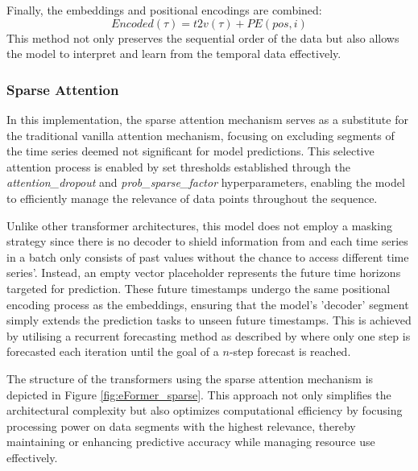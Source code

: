 \documentclass{article}
\begin{document}
Finally, the embeddings and positional encodings are combined:
\begin{equation}
    Encoded(\tau) = t2v(\tau) + PE(pos, i)
\end{equation}
This method not only preserves the sequential order of the data but also allows the model to interpret and learn from the temporal data effectively.


\subsubsection{Sparse Attention}

In this implementation, the sparse attention mechanism serves as a substitute for the traditional vanilla attention mechanism, focusing on excluding segments of the time series deemed not significant for model predictions. This selective attention process is enabled by set thresholds established through the \textit{attention\_dropout} and \textit{prob\_sparse\_factor} hyperparameters, enabling the model to efficiently manage the relevance of data points throughout the sequence.

Unlike other transformer architectures, this model does not employ a masking strategy since there is no decoder to shield information from and each time series in a batch only consists of past values without the chance to access different time series'. Instead, an empty vector placeholder represents the future time horizons targeted for prediction. These future timestamps undergo the same positional encoding process as the embeddings, ensuring that the model's 'decoder' segment simply extends the prediction tasks to unseen future timestamps. This is achieved by utilising a recurrent forecasting method as described by \cite{recurrent_forecasting} where only one step is forecasted each iteration until the goal of a $n$-step forecast is reached.

The structure of the transformers using the sparse attention mechanism is depicted in Figure \ref{fig:eFormer_sparse}. This approach not only simplifies the architectural complexity but also optimizes computational efficiency by focusing processing power on data segments with the highest relevance, thereby maintaining or enhancing predictive accuracy while managing resource use effectively.
\end{document}
